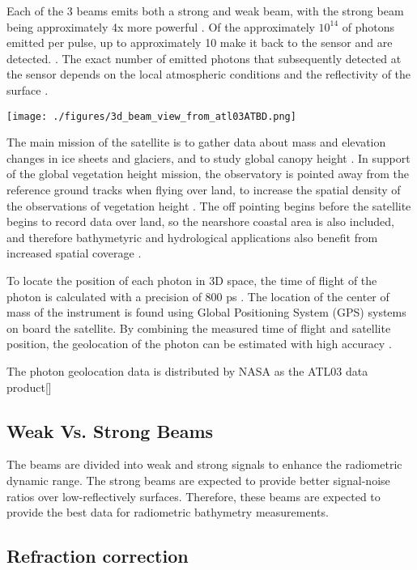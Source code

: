 Each of the 3 beams emits both a strong and weak beam, with the strong
beam being approximately 4x more powerful \cite{Neumann2019d}. Of the
approximately \(10^14\) of photons emitted per pulse, up to
approximately 10 make it back to the sensor and are detected.
\cite{Neumann2019d}. The exact number of emitted photons that
subsequently detected at the sensor depends on the local atmospheric
conditions and the reflectivity of the surface \cite{Neumann2019e}.

\texttt{[image: ./figures/3d\_beam\_view\_from\_atl03ATBD.png]}\cite{Neumann2019d}

The main mission of the satellite is to gather data about mass and
elevation changes in ice sheets and glaciers, and to study global canopy
height \cite{Markus2017}. In support of the global vegetation height
mission, the observatory is pointed away from the reference ground
tracks when flying over land, to increase the spatial density of the
observations of vegetation height \cite{Markus2017}. The off
pointing begins before the satellite begins to record data over land, so
the nearshore coastal area is also included, and therefore bathymetyric
and hydrological applications also benefit from increased spatial
coverage \cite{Magruder2021}.

To locate the position of each photon in 3D space, the time of flight of
the photon is calculated with a precision of 800 ps
\cite{Neumann2019d}. The location of the center of mass of the
instrument is found using Global Positioning System (GPS) systems on
board the satellite. By combining the measured time of flight and
satellite position, the geolocation of the photon can be estimated with
high accuracy \cite{Neumann2019d}.

The photon geolocation data is distributed by NASA as the ATL03 data
product{[}{]}

\hypertarget{weak-vs.-strong-beams}{%
  \subsection{Weak Vs. Strong Beams}\label{weak-vs.-strong-beams}}

The beams are divided into weak and strong signals to enhance the
radiometric dynamic range. The strong beams are expected to provide
better signal-noise ratios over low-reflectively surfaces.
\cite{Neumann2019d} Therefore, these beams are expected to provide
the best data for radiometric bathymetry measurements.

\hypertarget{refraction-correction}{%
  \subsection{Refraction correction}\label{refraction-correction}}

